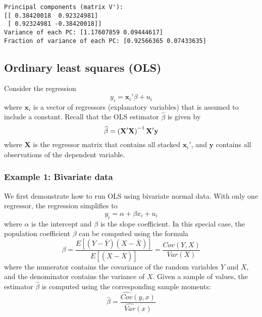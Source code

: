 \documentclass[10pt]{scrartcl}
\begin{document}
    \begin{Verbatim}[commandchars=\\\{\}]
Principal components (matrix V'):
[[ 0.38420018  0.92324981]
 [ 0.92324981 -0.38420018]]
Variance of each PC: [1.17607859 0.09444617]
Fraction of variance of each PC: [0.92566365 0.07433635]
    \end{Verbatim}


    \hypertarget{ordinary-least-squares-ols}{%
\subsection{Ordinary least squares
(OLS)}\label{ordinary-least-squares-ols}}

Consider the regression \[
y_i = \mathbf{x}_i' \beta + u_i
\] where \(\mathbf{x}_i\) is a vector of regressors (explanatory
variables) that is assumed to include a constant. Recall that the OLS
estimator \(\widehat{\beta}\) is given by \[
\def\bX{\mathbf{X}}
\def\bY{\mathbf{y}}
\widehat{\beta} = \left(\bX'\bX\right)^{-1}\bX'\bY
\] where \(\mathbf{X}\) is the regressor matrix that contains all
stacked \(\mathbf{x}_i'\), and \(\mathbf{y}\) contains all observations
of the dependent variable.

    \hypertarget{example-1-bivariate-data}{%
\subsubsection{Example 1: Bivariate
data}\label{example-1-bivariate-data}}

We first demonstrate how to run OLS using bivariate normal data. With
only one regressor, the regression simplifies to \[
y_i = \alpha + \beta x_i + u_i
\] where \(\alpha\) is the intercept and \(\beta\) is the slope
coefficient. In this special case, the population coefficient \(\beta\)
can be computed using the formula \[
\beta = \frac{E[(Y-\overline{Y})(X-\overline{X})]}{E[(X-\overline{X})]}
 = \frac{Cov(Y,X)}{Var(X)}
\] where the numerator contains the covariance of the random variables
\(Y\) and \(X\), and the denominator contains the variance of \(X\).
Given a sample of values, the estimator \(\widehat{\beta}\) is computed
using the corresponding sample moments: \[
\widehat{\beta} = \frac{\widehat{Cov}(y,x)}{\widehat{Var}(x)}
\]
\end{document}
